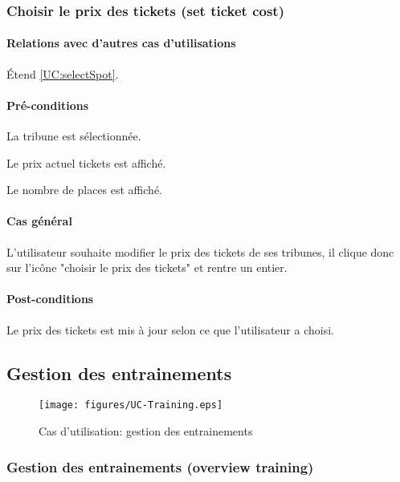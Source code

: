 \subsubsection{Choisir le prix des tickets (set ticket cost)}
\label{UC:setTicketPrice}
\paragraph{Relations avec d'autres cas d'utilisations}
Étend \ref{UC:selectSpot}.
\paragraph{Pré-conditions}
\begin{list}{}{\leftmargin=1.5em}
\item{La tribune est sélectionnée.}
\item{Le prix actuel tickets est affiché.}
\item{Le nombre de places est affiché.}
\end{list}
\paragraph{Cas général}
L'utilisateur souhaite modifier le prix des tickets de ses tribunes, il clique donc sur l'icône "choisir le prix des tickets" et rentre un entier.
\paragraph{Post-conditions}
\begin{list}{}{\leftmargin=1.5em}
\item{Le prix des tickets est mis à jour selon ce que l'utilisateur a choisi.}
\end{list}

\subsection{Gestion des entrainements}
\label{UC:trainingManagement}
\begin{figure}[h]
  \centering
  \texttt{[image: figures/UC-Training.eps]}
   \caption{\label{fig:UC:trainingManagement} Cas d'utilisation: gestion des entrainements}
\end{figure}

\subsubsection{Gestion des entrainements (overview training)}
\label{UC:trainingManagement}
